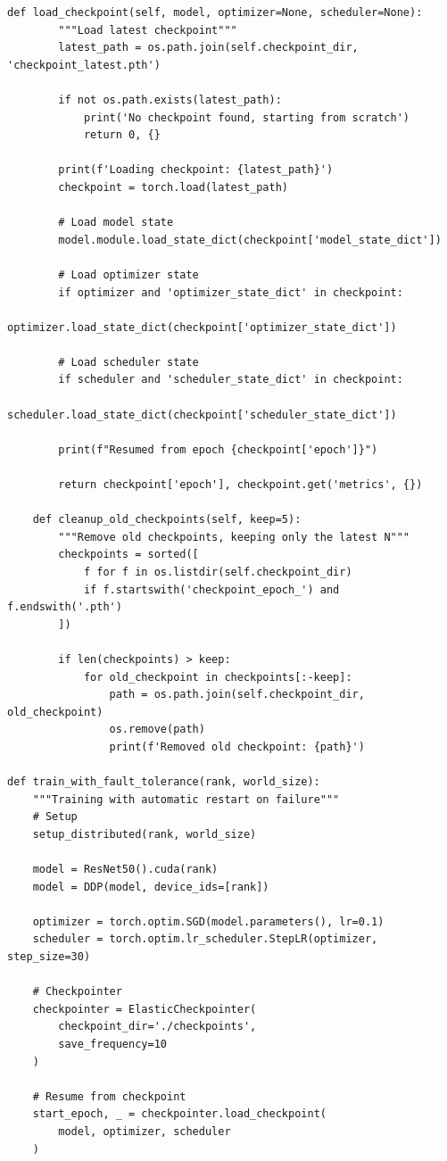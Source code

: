 \begin{lstlisting}[style=python, caption=Fault-tolerant training with elastic checkpointing]
    def load_checkpoint(self, model, optimizer=None, scheduler=None):
        """Load latest checkpoint"""
        latest_path = os.path.join(self.checkpoint_dir, 'checkpoint_latest.pth')

        if not os.path.exists(latest_path):
            print('No checkpoint found, starting from scratch')
            return 0, {}

        print(f'Loading checkpoint: {latest_path}')
        checkpoint = torch.load(latest_path)

        # Load model state
        model.module.load_state_dict(checkpoint['model_state_dict'])

        # Load optimizer state
        if optimizer and 'optimizer_state_dict' in checkpoint:
            optimizer.load_state_dict(checkpoint['optimizer_state_dict'])

        # Load scheduler state
        if scheduler and 'scheduler_state_dict' in checkpoint:
            scheduler.load_state_dict(checkpoint['scheduler_state_dict'])

        print(f"Resumed from epoch {checkpoint['epoch']}")

        return checkpoint['epoch'], checkpoint.get('metrics', {})

    def cleanup_old_checkpoints(self, keep=5):
        """Remove old checkpoints, keeping only the latest N"""
        checkpoints = sorted([
            f for f in os.listdir(self.checkpoint_dir)
            if f.startswith('checkpoint_epoch_') and f.endswith('.pth')
        ])

        if len(checkpoints) > keep:
            for old_checkpoint in checkpoints[:-keep]:
                path = os.path.join(self.checkpoint_dir, old_checkpoint)
                os.remove(path)
                print(f'Removed old checkpoint: {path}')

def train_with_fault_tolerance(rank, world_size):
    """Training with automatic restart on failure"""
    # Setup
    setup_distributed(rank, world_size)

    model = ResNet50().cuda(rank)
    model = DDP(model, device_ids=[rank])

    optimizer = torch.optim.SGD(model.parameters(), lr=0.1)
    scheduler = torch.optim.lr_scheduler.StepLR(optimizer, step_size=30)

    # Checkpointer
    checkpointer = ElasticCheckpointer(
        checkpoint_dir='./checkpoints',
        save_frequency=10
    )

    # Resume from checkpoint
    start_epoch, _ = checkpointer.load_checkpoint(
        model, optimizer, scheduler
    )


\end{lstlisting}
